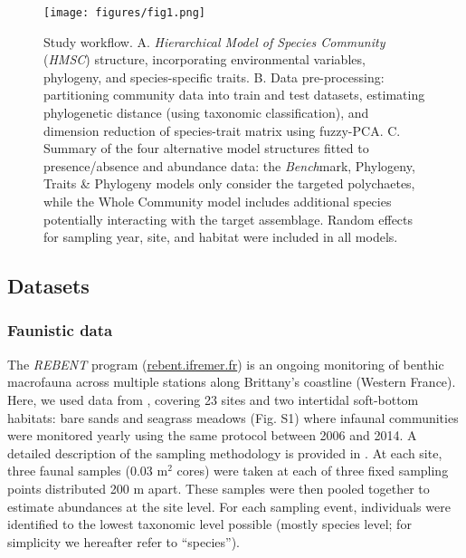 \documentclass[9pt,biorxiv,doublespacing,lineno]{lapreprint}
\begin{document}
\begin{figure}
\hypertarget{fig:chapt1workflow}{%
\centering
\texttt{[image: figures/fig1.png]}
\caption{Study workflow. A. \emph{Hierarchical Model of Species
Community} (\emph{HMSC}) structure, incorporating environmental
variables, phylogeny, and species-specific traits. B. Data
pre-processing: partitioning community data into train and test
datasets, estimating phylogenetic distance (using taxonomic
classification), and dimension reduction of species-trait matrix using
fuzzy-PCA. C. Summary of the four alternative model structures fitted to
presence/absence and abundance data: the \emph{Bench}mark, Phylogeny,
Traits \& Phylogeny models only consider the targeted polychaetes, while
the Whole Community model includes additional species potentially
interacting with the target assemblage. Random effects for sampling
year, site, and habitat were included in all
models.}\label{fig:chapt1workflow}
}
\end{figure}

\hypertarget{datasets}{%
\subsection{Datasets}\label{datasets}}

\hypertarget{faunistic-data}{%
\subsubsection{Faunistic data}\label{faunistic-data}}

The \emph{REBENT} program
(\href{https://rebent.ifremer.fr}{rebent.ifremer.fr}) is an ongoing
monitoring of benthic macrofauna across multiple stations along
Brittany's coastline (Western France). Here, we used data from
\textcite{Boye_2019a}, covering 23 sites and two intertidal soft-bottom
habitats: bare sands and seagrass meadows (Fig. S1) where infaunal
communities were monitored yearly using the same protocol between 2006
and 2014. A detailed description of the sampling methodology is provided
in \autocites[ ]{Boye_2017}{Boye_2019a}. At each site, three faunal
samples (0.03 m\(^2\) cores) were taken at each of three fixed sampling
points distributed 200 m apart. These samples were then pooled together
to estimate abundances at the site level. For each sampling event,
individuals were identified to the lowest taxonomic level possible
(mostly species level; for simplicity we hereafter refer to
``species'').
\end{document}
